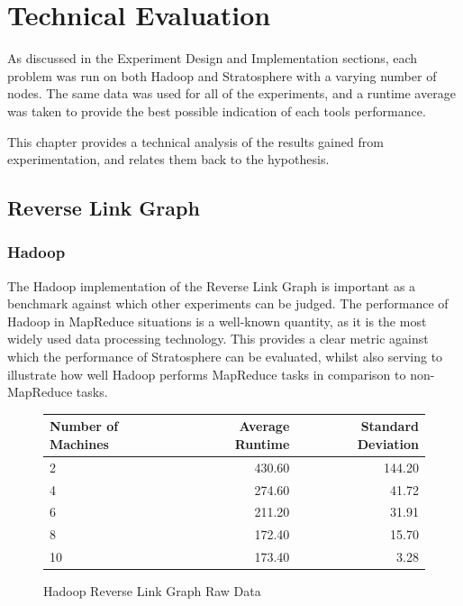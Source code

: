 \chapter{Technical Evaluation}
As discussed in the Experiment Design and Implementation sections, each problem was run on both Hadoop and Stratosphere with a varying number of nodes. The same data was used for all of the experiments, and a runtime average was taken to provide the best possible indication of each tools performance.

This chapter provides a technical analysis of the results gained from experimentation, and relates them back to the hypothesis.

\section{Reverse Link Graph}

\subsection{Hadoop}
The Hadoop implementation of the Reverse Link Graph is important as a benchmark against which other experiments can be judged. The performance of Hadoop in MapReduce situations is a well-known quantity, as it is the most widely used data processing technology. This provides a clear metric against which the performance of Stratosphere can be evaluated, whilst also serving to illustrate how well Hadoop performs MapReduce tasks in comparison to non-MapReduce tasks.

\begin{figure}[H]
\centering
	\begin{tabular}{lrr}
		\toprule
		Number of Machines & Average Runtime & Standard Deviation \\
		\midrule

		2 & 430.60 & 144.20 \\
		4 & 274.60 & 41.72 \\
		6 & 211.20 & 31.91 \\
		8 & 172.40 & 15.70 \\
		10 & 173.40 & 3.28 \\
		\bottomrule
	\end{tabular}
	\caption{Hadoop Reverse Link Graph Raw Data}
\end{figure}

